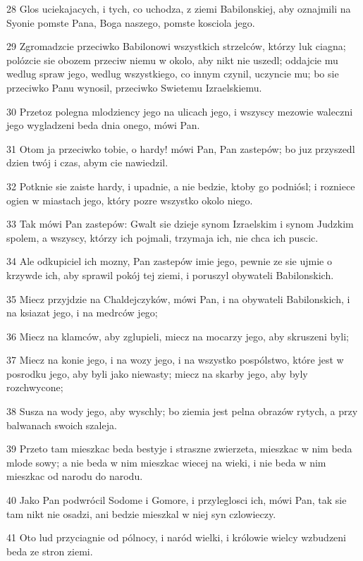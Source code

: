 \par 28 Glos uciekajacych, i tych, co uchodza, z ziemi Babilonskiej, aby oznajmili na Syonie pomste Pana, Boga naszego, pomste kosciola jego.
\par 29 Zgromadzcie przeciwko Babilonowi wszystkich strzelców, którzy luk ciagna; polózcie sie obozem przeciw niemu w okolo, aby nikt nie uszedl; oddajcie mu wedlug spraw jego, wedlug wszystkiego, co innym czynil, uczyncie mu; bo sie przeciwko Panu wynosil, przeciwko Swietemu Izraelskiemu.
\par 30 Przetoz polegna mlodziency jego na ulicach jego, i wszyscy mezowie waleczni jego wygladzeni beda dnia onego, mówi Pan.
\par 31 Otom ja przeciwko tobie, o hardy! mówi Pan, Pan zastepów; bo juz przyszedl dzien twój i czas, abym cie nawiedzil.
\par 32 Potknie sie zaiste hardy, i upadnie, a nie bedzie, ktoby go podniósl; i rozniece ogien w miastach jego, który pozre wszystko okolo niego.
\par 33 Tak mówi Pan zastepów: Gwalt sie dzieje synom Izraelskim i synom Judzkim spolem, a wszyscy, którzy ich pojmali, trzymaja ich, nie chca ich puscic.
\par 34 Ale odkupiciel ich mozny, Pan zastepów imie jego, pewnie ze sie ujmie o krzywde ich, aby sprawil pokój tej ziemi, i poruszyl obywateli Babilonskich.
\par 35 Miecz przyjdzie na Chaldejczyków, mówi Pan, i na obywateli Babilonskich, i na ksiazat jego, i na medrców jego;
\par 36 Miecz na klamców, aby zglupieli, miecz na mocarzy jego, aby skruszeni byli;
\par 37 Miecz na konie jego, i na wozy jego, i na wszystko pospólstwo, które jest w posrodku jego, aby byli jako niewasty; miecz na skarby jego, aby byly rozchwycone;
\par 38 Susza na wody jego, aby wyschly; bo ziemia jest pelna obrazów rytych, a przy balwanach swoich szaleja.
\par 39 Przeto tam mieszkac beda bestyje i straszne zwierzeta, mieszkac w nim beda mlode sowy; a nie beda w nim mieszkac wiecej na wieki, i nie beda w nim mieszkac od narodu do narodu.
\par 40 Jako Pan podwrócil Sodome i Gomore, i przyleglosci ich, mówi Pan, tak sie tam nikt nie osadzi, ani bedzie mieszkal w niej syn czlowieczy.
\par 41 Oto lud przyciagnie od pólnocy, i naród wielki, i królowie wielcy wzbudzeni beda ze stron ziemi.
